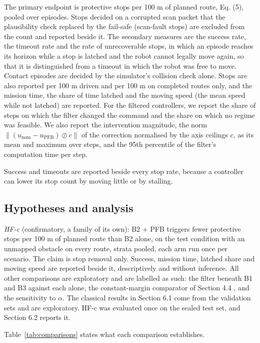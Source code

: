 The primary endpoint is protective stops per 100 m of planned route, Eq. (5), pooled over episodes. Stops decided on a corrupted scan packet that the plausibility check replaced by the fail-safe (scan-fault stops) are excluded from the count and reported beside it. The secondary measures are the success rate, the timeout rate and the rate of unrecoverable stops, in which an episode reaches its horizon while a stop is latched and the robot cannot legally move again, so that it is distinguished from a timeout in which the robot was free to move. Contact episodes are decided by the simulator's collision check alone. Stops are also reported per 100 m driven and per 100 m on completed routes only, and the mission time, the share of time latched and the moving speed (the mean speed while not latched) are reported. For the filtered controllers, we report the share of steps on which the filter changed the command and the share on which no regime was feasible. We also report the intervention magnitude, the norm $\|(u_{\mathrm{nom}} - u_{\mathrm{PFB}}) \oslash c\|$ of the correction normalised by the axis ceilings $c$, as its mean and maximum over steps, and the 95th percentile of the filter's computation time per step.

Success and timeouts are reported beside every stop rate, because a controller can lower its stop count by moving little or by stalling.

\subsection{Hypotheses and analysis}

\emph{HF-c} (confirmatory, a family of its own): B2 + PFB triggers fewer protective stops per 100 m of planned route than B2 alone, on the test condition with an unmapped obstacle on every route, strata pooled, each arm run once per scenario. The claim is stop removal only. Success, mission time, latched share and moving speed are reported beside it, descriptively and without inference. All other comparisons are exploratory and are labelled as such: the filter beneath B1 and B3 against each alone, the constant-margin comparator of Section 4.4 , and the sensitivity to $\alpha$. The classical results in Section 6.1 come from the validation sets and are exploratory. HF-c was evaluated once on the sealed test set, and Section 6.2 reports it.

Table~\ref{tab:comparisons} states what each comparison establishes.

